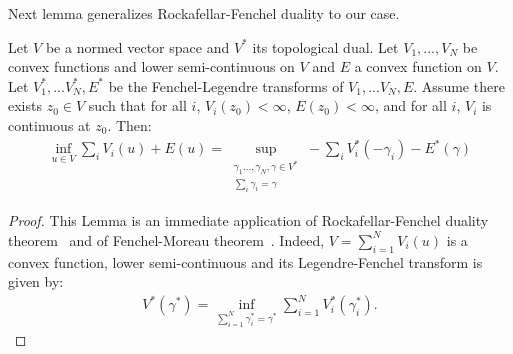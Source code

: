 Next lemma generalizes Rockafellar-Fenchel duality to our case.
\begin{lemma}
\label{lem:rockafellar-gene}
Let $V$ be a normed vector space and $V^*$ its topological dual. Let $V_1,...,V_N$ be convex functions and lower semi-continuous on $V$ and $E$ a convex function on $V$. Let $V^*_1,...V^*_N,E^*$ be the Fenchel-Legendre transforms of $V_1,...V_N,E$. Assume there exists $z_0\in V$ such that for all $i$, $V_i(z_0)<\infty$, $E(z_0)<\infty$, and for all $i$, $V_i$ is continuous at $z_0$. Then:
\begin{align*}
\inf_{u\in V} \sum_i V_i(u) + E(u) = \sup\limits_{\substack{\gamma_1...,\gamma_N,\gamma\in V^*\\\sum_i \gamma_i = \gamma}}-\sum_i V^*_i(-\gamma_i)-E^*(\gamma)
\end{align*}
\end{lemma}
\begin{proof}
This Lemma is an immediate application of Rockafellar-Fenchel duality theorem~\citep[Theorem 1.12]{brezis2010functional} and of Fenchel-Moreau theorem~\citep[Theorem 1.11]{brezis2010functional}. 
Indeed, $V = \sum\limits_{i=1}^N V_i(u)$ is a convex function, lower semi-continuous and its Legendre-Fenchel transform is given by:
\begin{align}
    V^{*}(\gamma^*)=\inf_{\sum\limits_{i=1}^N \gamma_{i}^*=\gamma^*}\sum_{i=1}^N V_i^{*}(\gamma_{i}^*).
\end{align}
\end{proof}




